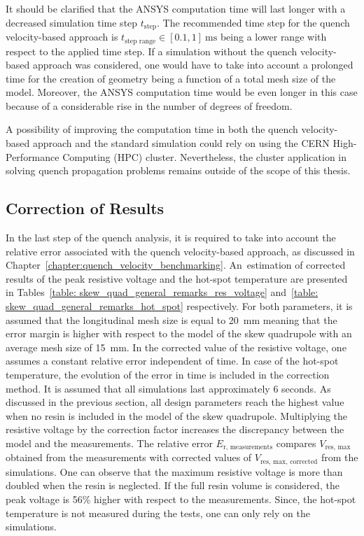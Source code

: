 It should be clarified that the ANSYS computation time will last longer with a decreased simulation time step $t_\text{step}$. The recommended time step for the quench velocity-based approach is $t_\text{step range} \in [0.1, 1]~\text{ms}$ being a lower range with respect to the applied time step. If a simulation without the quench velocity-based approach was considered, one would have to take into account a prolonged time for the creation of geometry being a function of a total mesh size of the model. Moreover, the ANSYS computation time would be even longer in this case because of a considerable rise in the number of degrees of freedom. 

A possibility of improving the computation time in both the quench velocity-based approach and the standard simulation could rely on using the CERN High-Performance Computing (HPC) cluster. Nevertheless, the cluster application in solving quench propagation problems remains outside of the scope of this thesis.


\subsection{Correction of Results}

In the last step of the quench analysis, it is required to take into account the relative error associated with the quench velocity-based approach, as discussed in Chapter~\ref{chapter:quench_velocity_benchmarking}. An~estimation of corrected results of the peak resistive voltage and the hot-spot temperature are presented in Tables~\ref{table: skew_quad_general_remarks_res_voltage} and~\ref{table: skew_quad_general_remarks_hot_spot} respectively. For both parameters, it is assumed that the longitudinal mesh size is equal to 20~mm meaning that the error margin is higher with respect to the model of the skew quadrupole with an average mesh size of 15~mm. In the corrected value of the resistive voltage, one assumes a constant relative error independent of time. In case of the hot-spot temperature, the evolution of the error in time is included in the correction method. It is assumed that all simulations last approximately 6 seconds. As discussed in the previous section, all design parameters reach the highest value when no resin is included in the model of the skew quadrupole. Multiplying the resistive voltage by the correction factor increases the discrepancy between the model and the measurements. The relative error $E_\text{r, measurements}$ compares $V_\text{res, max}$ obtained from the measurements with corrected values of $V_\text{res, max, corrected}$ from the simulations. One can observe that the maximum resistive voltage is more than doubled when the resin is neglected. If the full resin volume is considered, the peak voltage is 56\% higher with respect to the measurements. Since, the hot-spot temperature is not measured during the tests, one can only rely on the simulations.

